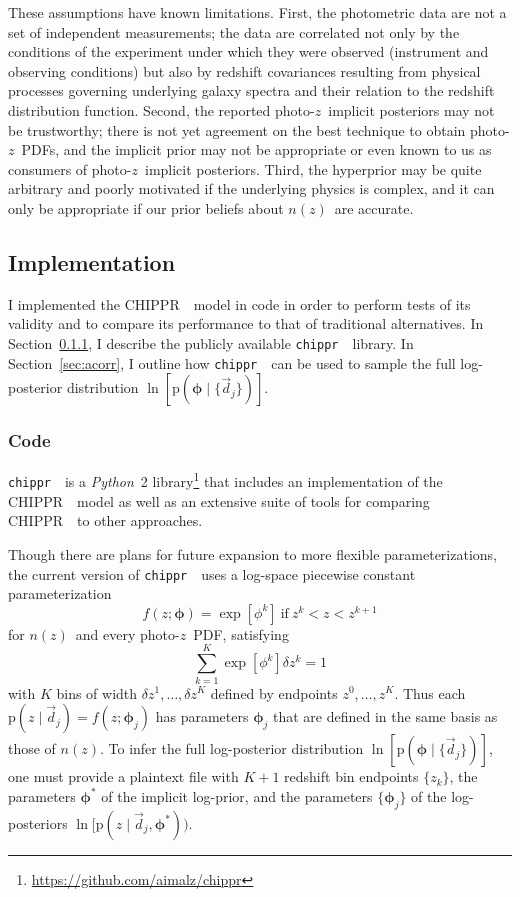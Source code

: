 \documentclass[iop]{emulateapj}
\newcommand{\Sect}[1]{Section~\ref{#1}}
\newcommand{\project}[1]{{\textsc{#1}}~}
\newcommand{\Chippr}{\project{CHIPPR}}
\newcommand{\repo}[1]{{\texttt{#1}}~}
\newcommand{\chippr}{\repo{chippr}}
\newcommand{\python}{\textit{Python}}
\newcommand{\nz}{$n(z)$}
\newcommand{\data}{\ensuremath{\vec{d}}}
\newcommand{\pr}[1]{\ensuremath{\mathrm{p}(#1)}}
\newcommand{\gvn}{\mid}%
\newcommand{\pz}{photo-$z$~}
\newcommand{\pzpdf}{\pz PDF}
\newcommand{\pzip}{\pz implicit posterior}
\newcommand{\bvec}[1]{{\ensuremath{\boldsymbol{#1}}}}
\newcommand{\ndphi}{\bvec{\phi}}
\begin{document}
These assumptions have known limitations.  
First, the photometric data are not a set of independent measurements; the data 
are correlated not only by the conditions of the experiment under which they 
were observed (instrument and observing conditions) but also by redshift 
covariances resulting from physical processes governing underlying galaxy 
spectra and their relation to the redshift distribution function.
Second, the reported \pzip s may not be trustworthy; there is not yet agreement 
on the best technique to obtain \pzpdf s, and the implicit prior may not be 
appropriate or even known to us as consumers of \pzip s.  
Third, the hyperprior may be quite arbitrary and poorly motivated if the 
underlying physics is complex, and it can only be appropriate if our prior 
beliefs about \nz\ are accurate.

\subsection{Implementation}
\label{sec:exp}

I implemented the \Chippr\ model in code in order to perform tests of its 
validity and to compare its performance to that of traditional alternatives.
In \Sect{sec:mcmc}, I describe the publicly available \chippr\ library.
In \Sect{sec:acorr}, I outline how \chippr\ can be used to sample the full 
log-posterior distribution $\ln[\pr{\ndphi \gvn \{\data_{j}\}}]$.

\subsubsection{Code}
\label{sec:mcmc}

\chippr\ is a \python\ 2 
library\footnote{\url{https://github.com/aimalz/chippr}} that includes an 
implementation of the \Chippr\ model as well as an extensive suite of tools for 
comparing \Chippr\ to other approaches.

Though there are plans for future expansion to more flexible parameterizations, 
the current version of \chippr\ uses a log-space piecewise constant 
parameterization
\begin{equation}
\label{eqn:logstepfunc}
f(z; \ndphi) = \exp[\phi^{k}]\ \mathrm{if}\ z^{k} < z < z^{k+1}
\end{equation}
for \nz\ and every \pzpdf, satisfying
\begin{equation}
\label{eqn:logstepfuncnorm}
\sum_{k=1}^{K} \exp[\phi^{k}] \delta z^{k} = 1
\end{equation}
with $K$ bins of width $\delta z^{1}, \dots, \delta z^{K}$ defined by endpoints 
$z^{0}, \dots, z^{K}$.
Thus each $\pr{z \gvn \data_{j}} = f(z; \ndphi_{j})$ has parameters 
$\ndphi_{j}$ that are defined in the same basis as those of \nz.
To infer the full log-posterior distribution $\ln[\pr{\ndphi \gvn 
\{\data_{j}\}}]$, one must provide a plaintext file with $K+1$ redshift bin 
endpoints $\{z_{k}\}$, the parameters $\ndphi^{*}$ of the implicit log-prior, 
and the parameters $\{\ndphi_{j}\}$ of the log-posteriors $\ln[\pr{z \gvn 
\data_{j}, \ndphi^{*})}$.
\end{document}
